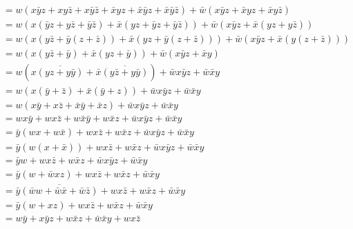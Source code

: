 \documentclass{article}
\begin{document}
    \begin{align*}
        &= w(x\bar{y}z + xy\bar{z} + x\bar{y}\bar{z} + \bar{x}yz + \bar{x}\bar{y}z + \bar{x}\bar{y}\bar{z}) + \bar{w}(x\bar{y}z + \bar{x}yz + \bar{x}y\bar{z}) \\
        &= w(x(\bar{y}z + y\bar{z} + \bar{y}\bar{z}) + \bar{x}(yz + \bar{y}z + \bar{y}\bar{z})) + \bar{w}(x\bar{y}z + \bar{x}(yz + y\bar{z})) \\
        &= w(x(y\bar{z} + \bar{y}(z + \bar{z})) + \bar{x}(yz + \bar{y}(z + \bar{z}))) + \bar{w}(x\bar{y}z + \bar{x}(y(z + \bar{z}))) \\
        &= w(x(y\bar{z} + \bar{y}) + \bar{x}(yz + \bar{y})) + \bar{w}(x\bar{y}z + \bar{x}y) \\
        &= w(x\overline{(yz + y\bar{y})} + \bar{x}\overline{(y\bar{z} + y\bar{y})}) + \bar{w}x\bar{y}z + \bar{w}\bar{x}y \\
        &= w(x(\bar{y} + \bar{z}) + \bar{x}(\bar{y} + z)) + \bar{w}x\bar{y}z + \bar{w}\bar{x}y \\ 
        &= w(x\bar{y} + x\bar{z} + \bar{x}\bar{y} + \bar{x}z) + \bar{w}x\bar{y}z + \bar{w}\bar{x}y \\
        &= wx\bar{y} + wx\bar{z} + w\bar{x}\bar{y} + w\bar{x}z + \bar{w}x\bar{y}z + \bar{w}\bar{x}y \\       
        &= \bar{y}(wx + w\bar{x}) + wx\bar{z} + w\bar{x}z + \bar{w}x\bar{y}z + \bar{w}\bar{x}y \\
        &= \bar{y}(w(x + \bar{x})) + wx\bar{z} + w\bar{x}z + \bar{w}x\bar{y}z + \bar{w}\bar{x}y \\
        &= \bar{y}w + wx\bar{z} + w\bar{x}z + \bar{w}x\bar{y}z + \bar{w}\bar{x}y \\
        &= \bar{y}(w + \bar{w}xz) + wx\bar{z} + w\bar{x}z + \bar{w}\bar{x}y \\
        &= \bar{y}\overline{(\bar{w}w + \bar{w}\bar{x} + \bar{w}\bar{z})} + wx\bar{z} + w\bar{x}z + \bar{w}\bar{x}y \\
        &= \bar{y}(w + xz) + wx\bar{z} + w\bar{x}z + \bar{w}\bar{x}y \\
        &= w\bar{y} + x\bar{y}z + w\bar{x}z + \bar{w}\bar{x}y + wx\bar{z}
    \end{align*}
\end{document}
